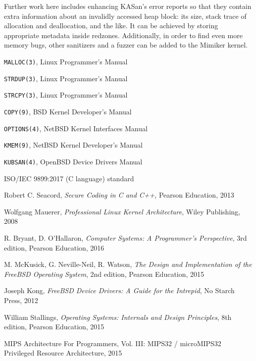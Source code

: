 \documentclass[shortabstract, manyadvisors, english, mgr]{iithesis}
\theoremstyle{definition} \newtheorem*{definition}{Definicja}
\theoremstyle{definition} \newtheorem*{example}{Przykład}
\theoremstyle{definition} \newtheorem*{remark}{Uwaga}
\begin{document}
Further work here includes enhancing KASan's error reports so that they contain extra information about an invalidly accessed heap block: its size, stack trace of allocation and deallocation, and the like.
It can be achieved by storing appropriate metadata inside redzones.
Additionally, in order to find even more memory bugs, other sanitizers and a fuzzer can be added to the Mimiker kernel.

\begin{thebibliography}{99}

\texttt{MALLOC(3)}, Linux Programmer's Manual

\texttt{STRDUP(3)}, Linux Programmer's Manual

\texttt{STRCPY(3)}, Linux Programmer's Manual

\texttt{COPY(9)}, BSD Kernel Developer's Manual

\texttt{OPTIONS(4)}, NetBSD Kernel Interfaces Manual

\texttt{KMEM(9)}, NetBSD Kernel Developer's Manual

\texttt{KUBSAN(4)}, OpenBSD Device Drivers Manual

ISO/IEC 9899:2017 (C language) standard

Robert C. Seacord,
\textit{Secure Coding in C and C++},
Pearson Education, 2013

Wolfgang Mauerer,
\textit{Professional Linux Kernel Architecture},
Wiley Publishing, 2008

R. Bryant, D. O'Hallaron,
\textit{Computer Systems: A Programmer's Perspective},
3rd edition,
Pearson Education,
2016

M. McKusick, G. Neville-Neil, R. Watson,
\textit{The Design and Implementation of the FreeBSD Operating System},
2nd edition, Pearson Education, 2015

Joseph Kong,
\textit{FreeBSD Device Drivers: A Guide for the Intrepid},
No Starch Press, 2012

William Stallings,
\textit{Operating Systems: Internals and Design Principles},
8th edition,
Pearson Education, 2015

MIPS Architecture For Programmers, Vol. III: MIPS32 / microMIPS32 Privileged Resource Architecture, 2015


\end{thebibliography}
\end{document}

